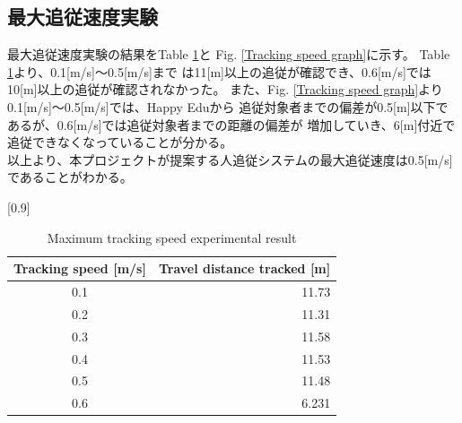 
\subsection{最大追従速度実験}
最大追従速度実験の結果をTable \ref{Maximum tracking speed experimental result}と
Fig. \ref{Tracking speed graph}に示す。
Table \ref{Maximum tracking speed experimental result}より、0.1[m/s]～0.5[m/s]まで
は11[m]以上の追従が確認でき、0.6[m/s]では10[m]以上の追従が確認されなかった。
また、Fig. \ref{Tracking speed graph}より0.1[m/s]～0.5[m/s]では、Happy Eduから
追従対象者までの偏差が0.5[m]以下であるが、0.6[m/s]では追従対象者までの距離の偏差が
増加していき、6[m]付近で追従できなくなっていることが分かる。\\ \indent
以上より、本プロジェクトが提案する人追従システムの最大追従速度は0.5[m/s]であることがわかる。

\begin{table}[h]
  \begin{center}
    \caption{{Maximum tracking speed experimental result}\label{Maximum tracking speed experimental result}}
    \scalebox{1.0}[0.9]{
      \begin{tabular}{c|r} \hline
        Tracking speed [m/s] & Travel distance tracked [m] \\ \hline
        0.1 & 11.73 \\
        0.2 & 11.31 \\
        0.3 & 11.58 \\
        0.4 & 11.53 \\
        0.5 & 11.48 \\
        0.6 & 6.231 \\ \hline
      \end{tabular}
    }
  \end{center}
\end{table}

